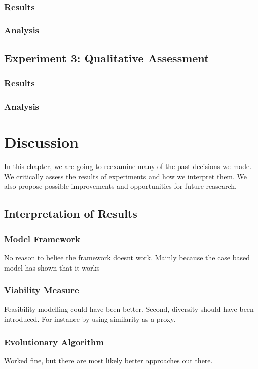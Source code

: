 \documentclass[12pt,a4paper]{report}
\begin{document}
\subsection{Results}

\subsection{Analysis}


\section{Experiment 3: Qualitative Assessment}
\subsection{Results}

\subsection{Analysis}



\chapter{Discussion}
\label{sec:dicussion}
In this chapter, we are going to reexamine many of the past decisions we made. We critically assess the results of experiments and how we interpret them. We also propose possible improvements and opportunities for future reasearch.

\section{Interpretation of Results}
\subsection{Model Framework}
No reason to beliee the framework doesnt work. Mainly because the case based model has shown that it works 
\subsection{Viability Measure}
Feasibility modelling could have been better. Second, diversity should have been introduced. For instance by using similarity as a proxy.
\subsection{Evolutionary Algorithm}
Worked fine, but there are most likely better approaches out there.
\end{document}
